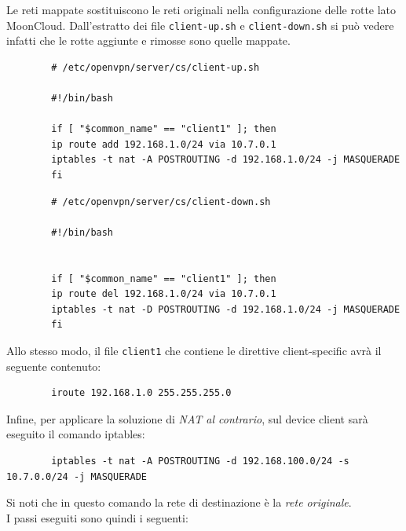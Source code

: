 		
	Le reti mappate sostituiscono le reti originali nella configurazione delle rotte lato
	MoonCloud. Dall'estratto dei file \texttt{client-up.sh} e
	\texttt{client-down.sh} si può vedere infatti che le rotte aggiunte e rimosse sono
	quelle mappate.
	\begin{verbatim}
		# /etc/openvpn/server/cs/client-up.sh
				
		#!/bin/bash
				
		if [ "$common_name" == "client1" ]; then
		ip route add 192.168.1.0/24 via 10.7.0.1
		iptables -t nat -A POSTROUTING -d 192.168.1.0/24 -j MASQUERADE
		fi
	\end{verbatim}
	\begin{verbatim}
		# /etc/openvpn/server/cs/client-down.sh
				
		#!/bin/bash
				
				
		if [ "$common_name" == "client1" ]; then
		ip route del 192.168.1.0/24 via 10.7.0.1
		iptables -t nat -D POSTROUTING -d 192.168.1.0/24 -j MASQUERADE
		fi
	\end{verbatim}
	Allo stesso modo, il file \texttt{client1} che contiene le direttive client-specific
	avrà il seguente contenuto:
	\begin{verbatim}
		iroute 192.168.1.0 255.255.255.0
	\end{verbatim}
	Infine, per applicare la soluzione di \textit{NAT al contrario}, sul device client
	sarà eseguito il comando iptables:
	\begin{verbatim}
		iptables -t nat -A POSTROUTING -d 192.168.100.0/24 -s 10.7.0.0/24 -j MASQUERADE
	\end{verbatim}
	Si noti che in questo comando la rete di destinazione è la \textit{rete originale}.\\
	I passi eseguiti sono quindi i seguenti:
